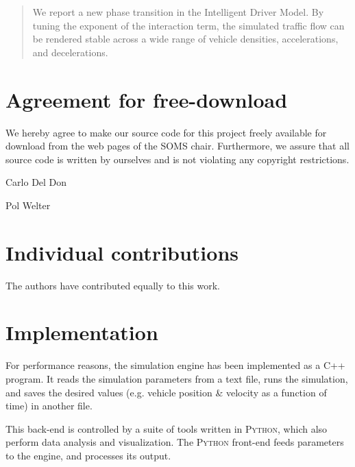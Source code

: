 




\begin{abstract}
We report a new phase transition in the Intelligent Driver Model. By tuning the exponent of the interaction term, the simulated traffic flow can be rendered stable across a wide range of vehicle densities, accelerations, and decelerations.
\end{abstract}
\newpage


\newpage
\section*{Agreement for free-download}
\bigskip\bigskip
\large We hereby agree to make our source code for this project freely available for download from the web pages of the SOMS chair. Furthermore, we assure that all source code is written by ourselves and is not violating any copyright restrictions.

\begin{minipage}[t][2cm][b]{0.45\textwidth}
    \centering Carlo Del Don
\end{minipage}
\begin{minipage}[t][2cm][b]{0.45\textwidth}
    \centering Pol Welter
\end{minipage}

\vspace{5cm}
\section*{Individual contributions}
\bigskip\bigskip
The authors have contributed equally to this work.

\newpage

\tableofcontents

\newpage




\section{Implementation}
For performance reasons, the simulation engine has been implemented as a \textsc{C++} program. It reads the simulation parameters from a text file, runs the simulation, and saves the desired values (e.g. vehicle position \& velocity as a function of time) in another file.

This back-end is controlled by a suite of tools written in \textsc{Python}, which also perform data analysis and visualization. The \textsc{Python} front-end feeds parameters to the engine, and processes its output.

